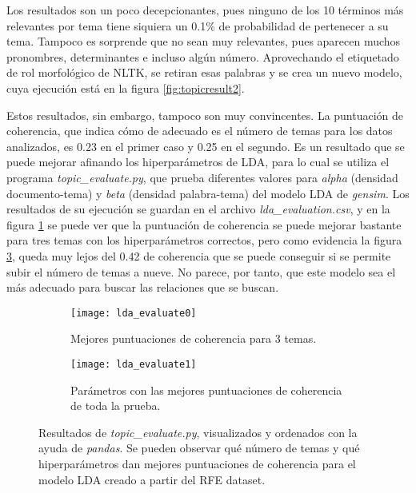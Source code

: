 \documentclass{pre-tfg}
\begin{document}
Los resultados son un poco decepcionantes, pues ninguno de los 10 términos más relevantes por tema tiene siquiera un 0.1\% de probabilidad de pertenecer a su tema.
Tampoco es sorprende que no sean muy relevantes, pues aparecen muchos pronombres, determinantes e incluso algún número. Aprovechando el etiquetado de rol morfológico de NLTK, se retiran esas palabras y se crea un nuevo modelo, cuya ejecución está en la figura \ref{fig:topicresult2}.


Estos resultados, sin embargo, tampoco son muy convincentes. La puntuación de coherencia, que indica cómo de adecuado es el número de temas para los datos analizados, es 0.23 en el primer caso y 0.25 en el segundo. Es un resultado que se puede mejorar afinando los hiperparámetros de LDA, para lo cual se utiliza el programa \textit{topic\_evaluate.py}, que prueba diferentes valores para \textit{alpha} (densidad documento-tema) y \textit{beta} (densidad palabra-tema) del modelo LDA de \textit{gensim}. Los resultados de su ejecución se guardan en el archivo \textit{lda\_evaluation.csv}, y en la figura \ref{fig:lda_eval0} se puede ver que la puntuación de coherencia se puede mejorar bastante para tres temas con los hiperparámetros correctos, pero como evidencia la figura \ref{fig:lda_eval1}, queda muy lejos del 0.42 de coherencia que se puede conseguir si se permite subir el número de temas a nueve. No parece, por tanto, que este modelo sea el más adecuado para buscar las relaciones que se buscan.


\begin{figure}
	\centering
	\begin{subfigure}{\textwidth}
		\texttt{[image: lda\_evaluate0]}
		\caption{Mejores puntuaciones de coherencia para 3 temas.}
		\label{fig:lda_eval0}
		
	\end{subfigure}
	\begin{subfigure}{\textwidth}
		\texttt{[image: lda\_evaluate1]}
		\caption{Parámetros con las mejores puntuaciones de coherencia de toda la prueba.}
		\label{fig:lda_eval1}
	\end{subfigure}
	
	\caption{Resultados de \textit{topic\_evaluate.py}, visualizados y ordenados con la ayuda de \textit{pandas}. Se pueden observar qué número de temas y qué hiperparámetros dan mejores puntuaciones de coherencia para el modelo LDA creado a partir del RFE dataset.}
	
\end{figure}
\end{document}
